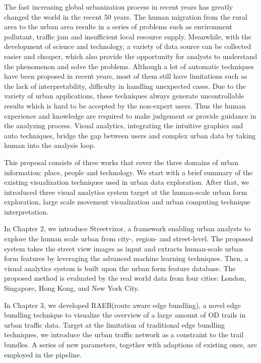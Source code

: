 The fast increasing global urbanization process in recent years has greatly changed the world in the recent 50 years. The human migration from the rural area to the urban area results in a series of problems such as environment pollutant, traffic jam and insufficient local resource supply. Meanwhile, with the development of science and technology, a variety of data source can be collected easier and cheaper, which also provide the opportunity for analysts to understand the phenomenon and solve the problems. Although a lot of automatic techniques have been proposed in recent years, most of them still have limitations such as the lack of interpretability, difficulty in handling unexpected cases. Due to the variety of urban applications, these techniques always generate uncontrollable results which is hard to be accepted by the non-expert users. Thus the human experience and knowledge are required to make judgement or provide guidance in the analyzing process. Visual analytics, integrating the intuitive graphics and auto techniques, bridge the gap between users and complex urban data by taking human into the analysis loop.  

This proposal consists of three works that cover the three domains of urban information: place, people and technology. We start with a brief summary of the existing visualization techniques used in urban data exploration. After that, we introduced three visual analytics system target at the human-scale urban form exploration, large scale movement visualization and urban computing technique interpretation. 

In Chapter 2, we introduce Streetvizor, a framework enabling urban analysts to explore the human scale urban from city-, region- and street-level. The proposed system takes the street view images as input and extracts human-scale urban form features by leveraging the advanced machine learning techniques. Then, a visual analytics system is built upon the urban form feature database. The proposed method is evaluated by the real world data from four cities: London, Singapore, Hong Kong, and New York City. 

In Chapter 3, we developed RAEB(route aware edge bundling), a novel edge bundling technique to visualize the overview of a large amount of OD trails in urban traffic data. Target at the limitation of traditional edge bundling techniques, we introduce the urban traffic network as a constraint to the trail bundles. A series of new parameters, together with adaptions of existing ones, are employed in the pipeline.

